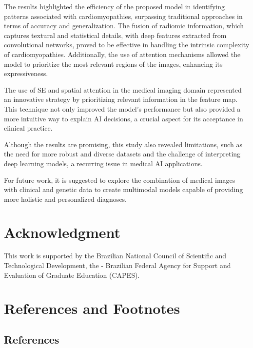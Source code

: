 \documentclass[journal,twoside,web]{ieeecolor}
\begin{document}
The results highlighted the efficiency of the proposed model in identifying patterns associated with cardiomyopathies, surpassing traditional approaches in terms of accuracy and generalization. The fusion of radiomic information, which captures textural and statistical details, with deep features extracted from convolutional networks, proved to be effective in handling the intrinsic complexity of cardiomyopathies. Additionally, the use of attention mechanisms allowed the model to prioritize the most relevant regions of the images, enhancing its expressiveness.  

The use of SE and spatial attention in the medical imaging domain represented an innovative strategy by prioritizing relevant information in the feature map. This technique not only improved the model’s performance but also provided a more intuitive way to explain AI decisions, a crucial aspect for its acceptance in clinical practice.  

Although the results are promising, this study also revealed limitations, such as the need for more robust and diverse datasets and the challenge of interpreting deep learning models, a recurring issue in medical AI applications. 


For future work, it is suggested to explore the combination of medical images with clinical and genetic data to create multimodal models capable of providing more holistic and personalized diagnoses. 


\appendices

\section*{Acknowledgment}

This work is supported by the Brazilian National Council of Scientific and Technological Development, the - Brazilian Federal Agency for Support and Evaluation of Graduate Education (CAPES).


\section*{References and Footnotes}
\subsection{References}
% 

% 


\end{document}
